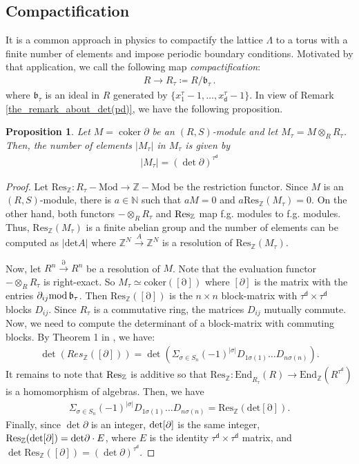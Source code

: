 \documentclass[sn-mathphys-num]{sn-jnl}
\newtheorem{proposition}[lemma]{Proposition}
\theoremstyle{definition}
\numberwithin{equation}{section}
\theoremstyle{definition}
\def\pd{\partial}
\def\bZ{\mathbb{Z}}
\def\La{{\Lambda}}
\def\coker{\operatorname{coker}}
\newcommand{\dd}{{\mathsf{d}}} %
\begin{document}
\subsection{Compactification} It is a common approach in physics to compactify the lattice $\La$ to a torus with a finite number of elements and impose periodic boundary conditions. Motivated by that application, we call the following map \textit{compactification}:
\begin{align}
   R\to R_{\tau}\coloneqq R/\mathfrak{b}_{\tau}\,.
\end{align}
where $\mathfrak{b}_{\tau}$ is an ideal in $R$ generated by $\{x_1^{\tau}-1,\ldots, x_{\dd}^{\tau}-1\}$.  In view of Remark \ref{the_remark_about_det(pd)}, we have the following proposition.
\begin{proposition}\label{prop_counting}
      Let $M=\coker \pd$ be an $(R,S)$-module and let $M_{\tau}=M\otimes_{R}R_{\tau}$. Then, the number of elements $|M_{\tau}|$ in $M_{\tau}$ is given by
      \begin{align}
          |M_{\tau}|=(\det \pd )^{\tau^\dd}
      \end{align}
\end{proposition}
\begin{proof}
Let $\mathrm{Res_{\bZ}}:R_{\tau}\!-\!\mathrm{Mod \to \bZ\!-\!Mod }$ be the restriction functor. Since $M$ is an $(R,S)$-module, there is $a\in \mathbb N$ such that $aM=0$ and $a\mathrm{Res_\bZ}(M_{\tau})=0$. On the other hand, both functors $-\otimes_R R_{\tau}$ and $\rm Res_\bZ$ map f.g. modules to f.g. modules. Thus, $\mathrm{Res_\bZ}(M_{\tau})$ is a finite abelian group and the number of elements can be computed as $|\mathrm{det}A|$ where $\bZ^{N}\overset{A}{\longrightarrow} \bZ^{N}$ is a resolution of $\mathrm{Res_\bZ}(M_{\tau})$.

Now, let $R^n\overset{\pd}{\longrightarrow} R^n$ be a resolution of $M$. Note that the evaluation functor $-\otimes_R R_{\tau}$ is right-exact. So $M_{\tau}\simeq \mathrm{ coker([\pd])}$ where $[\pd]$ is the matrix with the entries $\pd_{ij} {\rm mod}\, \mathfrak{b}_{\tau}$. Then $\mathrm {Res_\bZ([\pd])}$ is the $n\times n$ block-matrix with $\tau^\dd\times \tau^\dd$  blocks $D_{ij}$. Since $R_\tau$ is a commutative ring, the matrices $D_{ij}$ mutually commute. Now, we need to compute the determinant of a block-matrix with commuting blocks. By Theorem 1 in \cite{kovacs}, we have:
\begin{align}
\det (Res_\bZ([\pd]))=\det (\Sigma_{\sigma \in S_n} (-1)^{|\sigma|} D_{1\sigma(1)}\ldots   D_{n\sigma(n)}).
\end{align}
It remains to note that $\rm Res_\bZ$ is additive so that 
$\mathrm{Res_\bZ:End}_{R_{\tau}}(R)\to  \mathrm{End_{\bZ}}(R^{\tau^\dd})$
is  a homomorphism of algebras. Then, we have
\begin{align}
    \Sigma_{\sigma \in S_n}  (-1)^{|\sigma|} D_{1\sigma(1)}\ldots  D_{n\sigma(n)}= \mathrm{Res_\bZ(det[\pd])}.
\end{align}
Finally, since $\det\pd$ is an integer, $\rm det[\pd]$ is the same integer,  ${\rm Res_\bZ(det[\pd])=det \pd} \cdot E$, where $E$ is the identity $\tau^\dd\times \tau^\dd$ matrix, and $\det \mathrm{Res}_\bZ([\pd]) = (\det \pd)^{\tau^\dd}$. 
\end{proof} 
\end{document}
